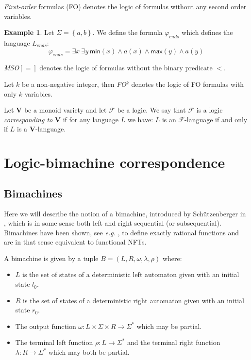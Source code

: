 \documentclass[12pt]{report}
\theoremstyle{definition}
\newtheorem{xmp}{Example}[section]
\theoremstyle{remark}
\begin{document}
\emph{First-order} formulas (FO) denotes the logic of formulas without any second order variables.
\begin{xmp}
Let $\Sigma=\left\{a,b\right\}$.
We define the formula $\varphi_{ends}$ which defines the language $L_{ends}$:
$$\varphi_{ends}=\exists x\ \exists y\ \mathsf{min}(x)\wedge a(x) \wedge\mathsf{max}(y)\wedge a(y)$$
\end{xmp}

\emph{MSO$[=]$} denotes the logic of formulas without the binary predicate $<$.

Let $k$ be a non-negative integer, then \emph{FO$^k$} denotes the logic of FO formulas with only $k$ variables.

Let \textbf V be a monoid variety and let $\mathcal F$ be a logic.
We say that $\mathcal F$ is a logic \emph{corresponding to} \textbf V if for any language $L$ we have:
$L$ is an $\mathcal F$-language if and only if $L$ is a \textbf V-language.



\chapter{Logic-bimachine correspondence}

\section{Bimachines}

Here we will describe the notion of a bimachine, introduced by Sch\"utzenberger in \cite{schutzenberger61}, which is in some sense both left and right sequential (or subsequential).
Bimachines have been shown, see \emph{e.g.} \cite{berstelb79}, to define exactly rational functions and are in that sense equivalent to functional NFTs.

A bimachine is given by a tuple $B=(L,R,\omega,\lambda,\rho)$ where:
\begin{itemize}
\item $L$ is the set of states of a deterministic left automaton given with an initial state $l_0$.
\item $R$ is the set of states of a deterministic right automaton given with an initial state $r_0$.
\item The output function $\omega:L\times \Sigma \times R\rightarrow \Sigma^\ast$ which may be partial.
\item The terminal left function $\rho:L\rightarrow \Sigma^\ast$ and the terminal right function $\lambda:R\rightarrow \Sigma^\ast$ which may both be partial.
\end{itemize}
\end{document}
